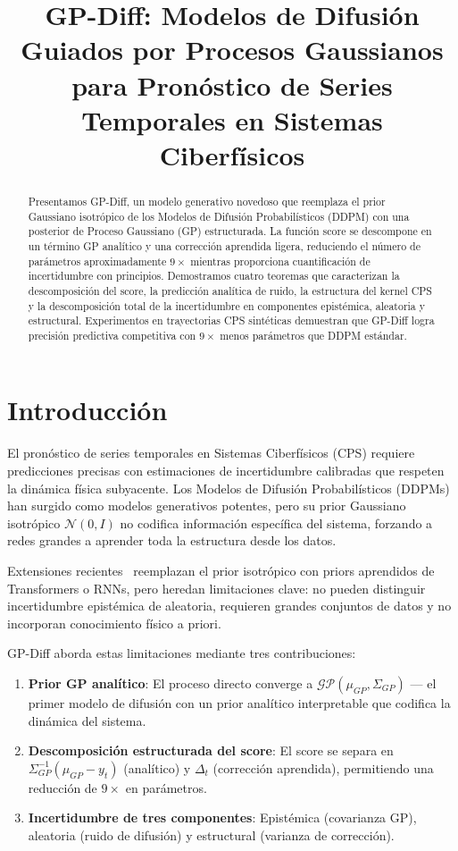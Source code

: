 \documentclass[conference]{IEEEtran}
\title{GP-Diff: Modelos de Difusión Guiados por Procesos Gaussianos\\para Pronóstico de Series Temporales en Sistemas Ciberfísicos}
\author{
\IEEEauthorblockN{Jose C.}
\IEEEauthorblockA{\textit{Departamento de Matemáticas Avanzadas}\\
\textit{Universidad...}\\
Email: jcalataiut@github.com}
\and
\IEEEauthorblockN{Hermes}
\IEEEauthorblockA{\textit{Asistente de Investigación IA}\\
Email: hermes@nousresearch.com}
}
\begin{document}
\maketitle

\begin{abstract}
Presentamos GP-Diff, un modelo generativo novedoso que reemplaza el prior Gaussiano isotrópico de los Modelos de Difusión Probabilísticos (DDPM) con una posterior de Proceso Gaussiano (GP) estructurada. La función score se descompone en un término GP analítico y una corrección aprendida ligera, reduciendo el número de parámetros aproximadamente $9\times$ mientras proporciona cuantificación de incertidumbre con principios. Demostramos cuatro teoremas que caracterizan la descomposición del score, la predicción analítica de ruido, la estructura del kernel CPS y la descomposición total de la incertidumbre en componentes epistémica, aleatoria y estructural. Experimentos en trayectorias CPS sintéticas demuestran que GP-Diff logra precisión predictiva competitiva con $9\times$ menos parámetros que DDPM estándar.
\end{abstract}

\section{Introducción}

El pronóstico de series temporales en Sistemas Ciberfísicos (CPS) requiere predicciones precisas con estimaciones de incertidumbre calibradas que respeten la dinámica física subyacente. Los Modelos de Difusión Probabilísticos (DDPMs)~\cite{ho2020} han surgido como modelos generativos potentes, pero su prior Gaussiano isotrópico $\mathcal{N}(0,I)$ no codifica información específica del sistema, forzando a redes grandes a aprender toda la estructura desde los datos.

Extensiones recientes~\cite{tmdm, nsdiff, armd} reemplazan el prior isotrópico con priors aprendidos de Transformers o RNNs, pero heredan limitaciones clave: no pueden distinguir incertidumbre epistémica de aleatoria, requieren grandes conjuntos de datos y no incorporan conocimiento físico a priori.

GP-Diff aborda estas limitaciones mediante tres contribuciones:
\begin{enumerate}
\item \textbf{Prior GP analítico}: El proceso directo converge a $\mathcal{GP}(\mu_{GP}, \Sigma_{GP})$ — el primer modelo de difusión con un prior analítico interpretable que codifica la dinámica del sistema.
\item \textbf{Descomposición estructurada del score}: El score se separa en $\Sigma_{GP}^{-1}(\mu_{GP} - y_t)$ (analítico) y $\Delta_t$ (corrección aprendida), permitiendo una reducción de $9\times$ en parámetros.
\item \textbf{Incertidumbre de tres componentes}: Epistémica (covarianza GP), aleatoria (ruido de difusión) y estructural (varianza de corrección).
\end{enumerate}
\end{document}
